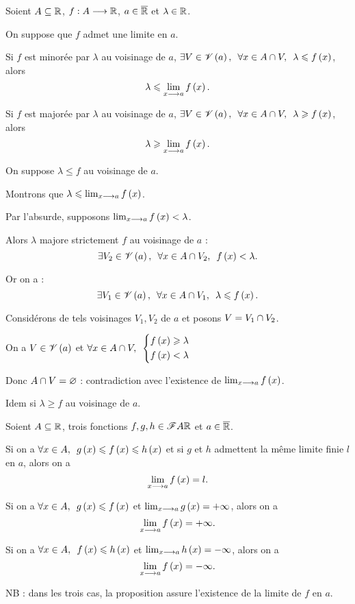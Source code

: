 \begin{cor}
Soient \(A\subseteq\mathbb{R}\), \(f:A\longrightarrow\mathbb{R}\), \(a\in\overline{\mathbb{R}}\) et \(\lambda\in\mathbb{R}\).

On suppose que \(f\) admet une limite en \(a\).

Si \(f\) est minorée par \(\lambda\) au voisinage de \(a\), \cad \(\quantifs{\exists V\in\V{a};\forall x\in A\inter V}\lambda\leq f\paren{x}\), alors \[\lambda\leqslant\lim_{x\longrightarrow a}f\left(x\right).\]

Si \(f\) est majorée par \(\lambda\) au voisinage de \(a\), \cad \(\quantifs{\exists V\in\V{a};\forall x\in A\inter V}\lambda\geq f\paren{x}\), alors \[\lambda\geqslant\lim_{x\longrightarrow a}f\left(x\right).\]
\end{cor}

\begin{dem}
On suppose \(\lambda\leq f\) au voisinage de \(a\).

Montrons que \(\lambda\leqslant\lim_{x\longrightarrow a}f\left(x\right)\).

Par l'absurde, supposons \(\lim_{x\longrightarrow a}f\left(x\right)<\lambda\).

Alors \(\lambda\) majore strictement \(f\) au voisinage de \(a\) : \[\quantifs{\exists V_2\in\V{a};\forall x\in A\inter V_2}f\paren{x}<\lambda.\]

Or on a : \[\quantifs{\exists V_1\in\V{a};\forall x\in A\inter V_1}\lambda\leq f\paren{x}.\]

Considérons de tels voisinages \(V_1,V_2\) de \(a\) et posons \(V=V_1\cap V_2\).

On a \(V\in\mathscr{V}\left(a\right)\) et \(\quantifs{\forall x\in A\inter V}\begin{dcases}f\paren{x}\geq\lambda \\ f\paren{x}<\lambda\end{dcases}\)

Donc \(A\cap V=\varnothing\) : contradiction avec l'existence de \(\lim_{x\longrightarrow a}f\left(x\right)\).

Idem si \(\lambda\geq f\) au voisinage de \(a\).
\end{dem}

\begin{prop}
Soient \(A\subseteq\mathbb{R}\), trois fonctions \(f,g,h\in\mathscr{F}{A}{\mathbb{R}}\) et \(a\in\overline{\mathbb{R}}\).

Si on a \(\quantifs{\forall x\in A}g\paren{x}\leq f\paren{x}\leq h\paren{x}\) et si \(g\) et \(h\) admettent la même limite finie \(l\) en \(a\), alors on a \[\lim_{x\longrightarrow a}f\left(x\right)=l.\]

Si on a \(\quantifs{\forall x\in A}g\paren{x}\leq f\paren{x}\) et \(\lim_{x\longrightarrow a}g\left(x\right)=+\infty\), alors on a \[\lim_{x\longrightarrow a}f\left(x\right)=+\infty.\]

Si on a \(\quantifs{\forall x\in A}f\paren{x}\leq h\paren{x}\) et \(\lim_{x\longrightarrow a}h\left(x\right)=-\infty\), alors on a \[\lim_{x\longrightarrow a}f\left(x\right)=-\infty.\]

NB : dans les trois cas, la proposition assure l'existence de la limite de \(f\) en \(a\).
\end{prop}

